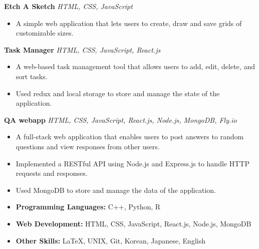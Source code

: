 \documentclass[a4paper,12pt]{article}
\begin{document}
\textbf{Etch A Sketch} 
\href{https://uliba3.github.io/Etch-A-Sketch/}{\faGlobe} 
\href{https://github.com/uliba3/Etch-A-Sketch}{\faGithub}
\textit{HTML, CSS, JavaScript}
\begin{itemize}
    \item A simple web application that lets users to create, draw and save grids of customizable sizes.
\end{itemize}
\textbf{Task Manager} 
\href{https://uliba3.github.io/TaskManager/}{\faGlobe}
\href{https://github.com/uliba3/TaskManager}{\faGithub}
\textit{HTML, CSS, JavaScript, React.js}
\begin{itemize}
    \item A web-based task management tool that allows users to add, edit, delete, and sort tasks.
    \item Used redux and local storage to store and manage the state of the application.
\end{itemize}
\textbf{QA webapp}
\href{https://white-voice-4708.fly.dev/}{\faGlobe}
\href{https://github.com/uliba3/Q-A-backend}{\faGithub}
\textit{HTML, CSS, JavaScript, React.js, Node.js, MongoDB, Fly.io}
\begin{itemize}
    \item A full-stack web application that enables users to post answers to random questions and view responses from other users.
    \item Implemented a RESTful API using Node.js and Express.js to handle HTTP requests and responses.
    \item Used MongoDB to store and manage the data of the application.
\end{itemize}

\begin{itemize}
    \item \textbf{Programming Languages:} C++, Python, R
    \item \textbf{Web Development:} HTML, CSS, JavaScript, React.js, Node.js, MongoDB
    \item \textbf{Other Skills:} LaTeX, UNIX, Git, Korean, Japanese, English
\end{itemize}
\end{document}
